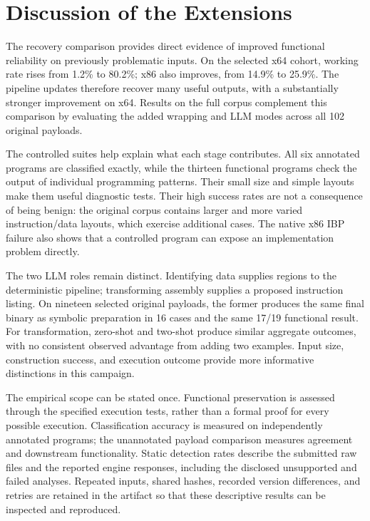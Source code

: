 \section{Discussion of the Extensions}\label{sec:extension_limits}
The recovery comparison provides direct evidence of improved functional
reliability on previously problematic inputs. On the selected x64 cohort,
working rate rises from 1.2\% to 80.2\%; x86 also improves, from 14.9\%
to 25.9\%. The pipeline updates therefore recover many useful outputs,
with a substantially stronger improvement on x64. Results on the full
corpus complement this comparison by evaluating the added wrapping and
LLM modes across all 102 original payloads.

The controlled suites help explain what each stage contributes. All six
annotated programs are classified exactly, while the thirteen functional
programs check the output of individual programming patterns. Their small
size and simple layouts make them useful diagnostic tests. Their high
success rates are not a consequence of being benign: the original corpus
contains larger and more varied instruction/data layouts, which exercise
additional cases. The native x86 IBP failure also shows that a controlled
program can expose an implementation problem directly.

The two LLM roles remain distinct. Identifying data supplies regions to
the deterministic pipeline; transforming assembly supplies a proposed
instruction listing. On nineteen selected original payloads, the former
produces the same final binary as symbolic preparation in 16 cases and
the same 17/19 functional result. For transformation, zero-shot and two-shot
produce similar aggregate outcomes, with no consistent observed advantage
from adding two examples. Input size, construction success, and execution
outcome provide more informative distinctions in this campaign.

The empirical scope can be stated once. Functional preservation is assessed
through the specified execution tests, rather than a formal proof for every
possible execution. Classification accuracy is measured on independently
annotated programs; the unannotated payload comparison measures agreement
and downstream functionality. Static detection rates describe the submitted
raw files and the reported engine responses, including the disclosed
unsupported and failed analyses. Repeated inputs, shared hashes, recorded
version differences, and retries are retained in the artifact so that these
descriptive results can be inspected and reproduced.
